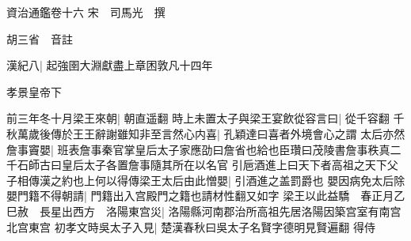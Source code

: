 資治通鑑卷十六
宋　司馬光　撰

胡三省　音註

漢紀八|{
	起強圉大淵獻盡上章困敦凡十四年}


孝景皇帝下

前三年冬十月梁王來朝|{
	朝直遥翻}
時上未置太子與梁王宴飲從容言曰|{
	從千容翻}
千秋萬歲後傳於王王辭謝雖知非至言然心内喜|{
	孔穎達曰喜者外境會心之謂}
太后亦然詹事竇嬰|{
	班表詹事秦官掌皇后太子家應劭曰詹省也給也臣瓚曰茂陵書詹事秩真二千石師古曰皇后太子各置詹事隨其所在以名官}
引巵酒進上曰天下者高祖之天下父子相傳漢之約也上何以得傳梁王太后由此憎嬰|{
	引酒進之盖罰爵也}
嬰因病免太后除嬰門籍不得朝請|{
	門籍出入宫殿門之籍也請材性翻又如字}
梁王以此益驕　春正月乙巳赦　長星出西方　洛陽東宫災|{
	洛陽縣河南郡治所高祖先居洛陽因築宫室有南宫北宫東宫}
初孝文時吳太子入見|{
	楚漢春秋曰吳太子名賢字德明見賢遍翻}
得侍

